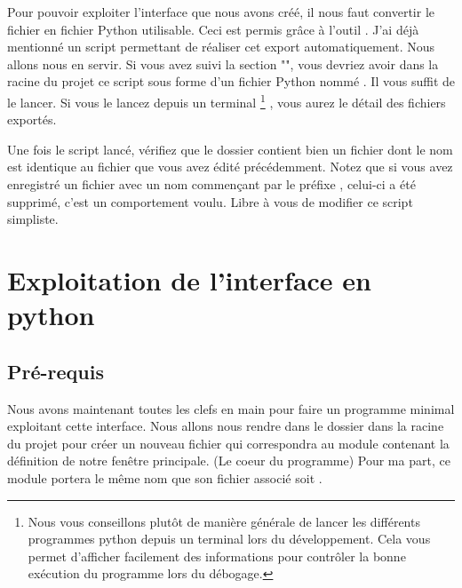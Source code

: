 {Pour pouvoir exploiter l'interface que nous avons créé, il nous faut convertir le fichier  en fichier Python utilisable.\newline
Ceci est permis grâce à l'outil .\newline
J'ai déjà mentionné un script permettant de réaliser cet export automatiquement. Nous allons nous en servir. Si vous avez suivi la section "", vous devriez avoir dans la racine du projet ce script sous forme d'un fichier Python nommé . Il vous suffit de le lancer. Si vous le lancez depuis un terminal
\footnote
{
Nous vous conseillons plutôt de manière générale de lancer les différents programmes python depuis un terminal lors du développement. Cela vous permet d'afficher facilement des informations pour contrôler la bonne exécution du programme lors du débogage.
}
, vous aurez le détail des fichiers exportés.\newline


Une fois le script lancé, vérifiez que le dossier  contient bien un fichier dont le nom est identique au fichier  que vous avez édité précédemment. Notez que si vous avez enregistré un fichier avec un nom commençant par le préfixe , celui-ci a été supprimé, c'est un comportement voulu. Libre à vous de modifier ce script simpliste.



\section{Exploitation de l'interface en python}

\subsection{Pré-requis}

Nous avons maintenant toutes les clefs en main pour faire un programme minimal exploitant cette interface.\newline
Nous allons nous rendre dans le dossier  dans la racine du projet pour créer un nouveau fichier qui correspondra au module contenant la définition de notre fenêtre principale. (Le coeur du programme)\newline
Pour ma part, ce module portera le même nom que son fichier  associé soit .

}
